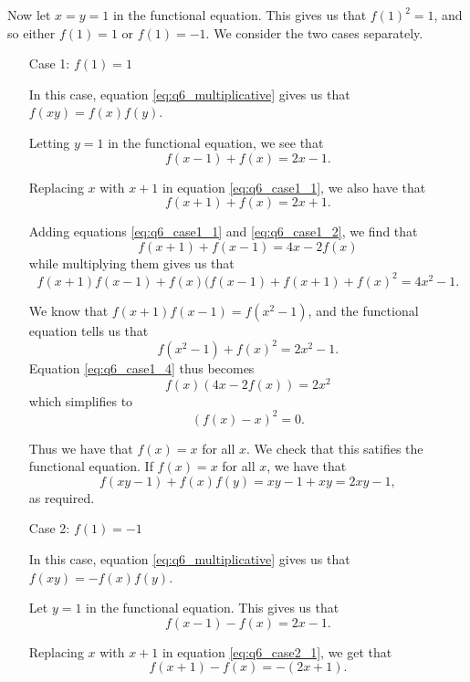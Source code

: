 \documentclass[12pt]{article}
\begin{document}
\begin{enumerate}
Now let $x = y = 1$ in the functional equation. This gives us that $f(1)^2 = 1$,
and so either $f(1) = 1$ or $f(1) = -1$. We consider the two cases separately.

\begin{enumerate}

\item[Case 1:] $f(1) = 1$

In this case, equation \ref{eq:q6_multiplicative} gives us that $f(xy) = f(x)
f(y)$.

Letting $y = 1$ in the functional equation, we see that
\begin{equation} \label{eq:q6_case1_1}
    f(x - 1) + f(x) = 2x - 1.
\end{equation}

Replacing $x$ with $x + 1$ in equation \ref{eq:q6_case1_1}, we also have that
\begin{equation} \label{eq:q6_case1_2}
    f(x + 1) + f(x) = 2x + 1.
\end{equation}

Adding equations \ref{eq:q6_case1_1} and \ref{eq:q6_case1_2}, we find that
\[
    f(x + 1) + f(x - 1) = 4x - 2f(x)
\]
while multiplying them gives us that
\begin{equation} \label{eq:q6_case1_4}
    f(x + 1) f(x - 1) + f(x) (f(x - 1) + f(x + 1) + f(x)^2 = 4x^2 - 1.
\end{equation}

We know that $f(x + 1) f(x - 1) = f(x^2 - 1)$, and the functional equation tells
us that
\[
    f(x^2 - 1) + f(x)^2 = 2x^2 - 1.
\]
Equation \ref{eq:q6_case1_4} thus becomes
\[
    f(x) (4x - 2f(x)) = 2x^2
\]
which simplifies to
\[
    (f(x) - x)^2 = 0.
\]

Thus we have that $f(x) = x$ for all $x$. We check that this satifies the
functional equation. If $f(x) = x$ for all $x$, we have that
\[
    f(xy - 1) + f(x) f(y) = xy - 1 + xy = 2xy - 1,
\]
as required.

\item[Case 2:] $f(1) = -1$

In this case, equation \ref{eq:q6_multiplicative} gives us that $f(xy) = -f(x)
f(y)$.

Let $y = 1$ in the functional equation. This gives us that
\begin{equation} \label{eq:q6_case2_1}
    f(x - 1) - f(x) = 2x - 1.
\end{equation}

Replacing $x$ with $x + 1$ in equation \ref{eq:q6_case2_1}, we get that
\begin{equation} \label{eq:q6_case2_2}
    f(x + 1) - f(x) = -(2x + 1).
\end{equation}


\end{enumerate}
\end{enumerate}
\end{document}
